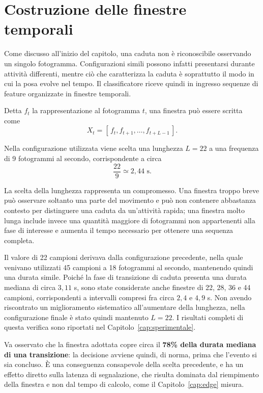 \section{Costruzione delle finestre temporali}
\label{sec:finestre}

Come discusso all'inizio del capitolo, una caduta non è riconoscibile osservando un singolo fotogramma. Configurazioni simili possono infatti presentarsi durante attività differenti, mentre ciò che caratterizza la caduta è soprattutto il modo in cui la posa evolve nel tempo. Il classificatore riceve quindi in ingresso sequenze di feature organizzate in finestre temporali.

Detta $f_t$ la rappresentazione al fotogramma $t$, una finestra può essere scritta come
\[
X_t = [\,f_t, f_{t+1},\dots, f_{t+L-1}\,].
\]

Nella configurazione utilizzata viene scelta una lunghezza $L=22$ a una frequenza di 9 fotogrammi al secondo, corrispondente a circa
\[
\frac{22}{9}\simeq 2{,}44\text{ s}.
\]

La scelta della lunghezza rappresenta un compromesso. Una finestra troppo breve può osservare soltanto una parte del movimento e può non contenere abbastanza contesto per distinguere una caduta da un'attività rapida; una finestra molto lunga include invece una quantità maggiore di fotogrammi non appartenenti alla fase di interesse e aumenta il tempo necessario per ottenere una sequenza completa.

Il valore di 22 campioni derivava dalla configurazione precedente, nella quale venivano utilizzati 45 campioni a 18 fotogrammi al secondo, mantenendo quindi una durata simile. Poiché la fase di transizione di caduta presenta una durata mediana di circa $3{,}11$ s, sono state considerate anche finestre di 22, 28, 36 e 44 campioni, corrispondenti a intervalli compresi fra circa $2{,}4$ e $4{,}9$ s. Non avendo riscontrato un miglioramento sistematico all'aumentare della lunghezza, nella configurazione finale è stato quindi mantenuto $L=22$. I risultati completi di questa verifica sono riportati nel Capitolo~\ref{cap:sperimentale}.

Va osservato che la finestra adottata copre circa il \textbf{78\% della durata mediana di una transizione}: la decisione avviene quindi, di norma, prima che l'evento si sia concluso. È una conseguenza consapevole della scelta precedente, e ha un effetto diretto sulla latenza di segnalazione, che risulta dominata dal riempimento della finestra e non dal tempo di calcolo, come il Capitolo~\ref{cap:edge} misura.

